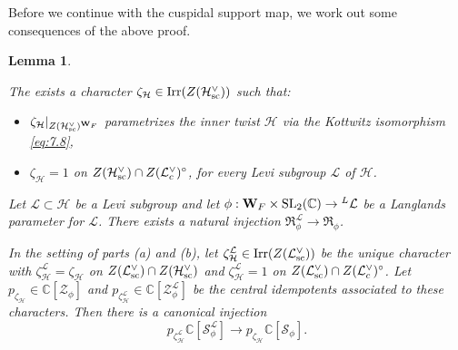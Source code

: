 \documentclass[11pt]{amsart}
\newtheorem{lem}[thm]{Lemma}
\theoremstyle{definition}
\newcommand{\enuma}[1]{\begin{enumerate}[\textup{(}a\textup{)}] {#1} \end{enumerate}}
\newcommand{\mb}{\mathbf}
\newcommand{\C}{\mathbb C}
\def\Irr{{\rm Irr}}
\def\SL{{\rm SL}}
\def\cS{{\mathcal S}}
\def\cL{{\mathcal L}}
\def\cH{{\mathcal H}}
\def\cR{{\mathfrak R}}
\def\cZ{{\mathcal Z}}
\def\sc{{\rm sc}}
\begin{document}
Before we continue with the cuspidal support map, we work out some consequences of
the above proof.

\begin{lem}\label{lem:7.14}
\enuma{
\item The exists a character $\zeta_\cH \in \Irr (Z(\cH^\vee_\sc))$ such that:
\begin{itemize}
\item $\zeta_\cH |_{Z(\cH^\vee_\sc)^{\mb W_F}}$ parametrizes the inner twist $\cH$ via
the Kottwitz isomorphism \eqref{eq:7.8},
\item $\zeta_\cH = 1$ on $Z(\cH^\vee_\sc) \cap Z(\cL^\vee_c)^\circ$, for every Levi
subgroup $\cL$ of $\cH$.
\end{itemize}
\item Let $\cL \subset \cH$ be a Levi subgroup and let $\phi : \mb W_F \times \SL_2 
(\C) \to {}^L \cL$ be a Langlands parameter for $\cL$. There exists a natural injection
$\cR_\phi^\cL \to \cR_\phi$.
\item In the setting of parts (a) and (b), let $\zeta_\cH^\cL \in \Irr (Z(\cL^\vee_\sc))$ 
be the unique character with $\zeta_\cH^\cL = \zeta_\cH$ on 
$Z(\cL^\vee_\sc) \cap Z(\cH^\vee_\sc)$ and $\zeta_\cH^\cL = 1$
on $Z(\cL^\vee_\sc) \cap Z(\cL^\vee_c)^\circ$. Let $p_{\zeta_\cH} \in \C[\cZ_\phi]$ and
$p_{\zeta_\cH^\cL} \in \C[\cZ_\phi^\cL]$ be the central idempotents associated to these
characters. Then there is a canonical injection
\[
p_{\zeta_\cH^\cL} \C [\cS_\phi^\cL] \to p_{\zeta_\cH} \C[\cS_\phi].
\]
}
\end{lem}
\end{document}
